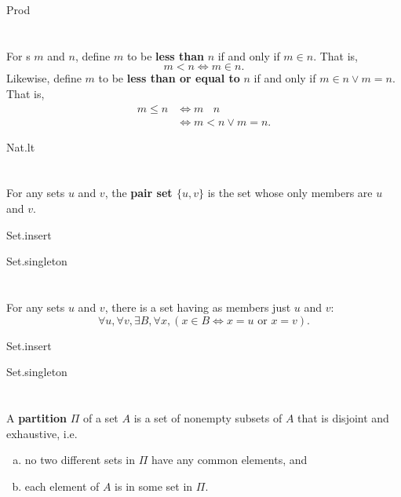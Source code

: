 \documentclass{report}
\newcommand{\ineq}{\,\mathop{\underline{\in}}\,}
\begin{document}
    {Prod}

\section{}%

  For s $m$ and $n$, define $m$ to be
    \textbf{less than} $n$ if and only if $m \in n$.
  That is, $$m < n \iff m \in n.$$
  Likewise, define $m$ to be \textbf{less than or equal to} $n$ if and only if
    $m \in n \lor m = n$.
  That is,
    \begin{align*}
      m \leq n
        & \iff m \ineq n \\
        & \iff m < n \lor m = n.
    \end{align*}

    {Nat.lt}

\section{}%

  For any sets $u$ and $v$, the \textbf{pair set $\{u, v\}$} is the set whose
    only members are $u$ and $v$.

    {Set.insert}

    {Set.singleton}

\section{}%

  For any sets $u$ and $v$, there is a set having as members just $u$ and $v$:
    $$\forall u, \forall v, \exists B, \forall x,
        (x \in B \iff x = u \text{ or } x = v).$$

    {Set.insert}

    {Set.singleton}

\section{}%

  A \textbf{partition} $\Pi$ of a set $A$ is a set of nonempty subsets of $A$
    that is disjoint and exhaustive, i.e.
    \begin{enumerate}[(a)]
      \item no two different sets in $\Pi$ have any common elements, and
      \item each element of $A$ is in some set in $\Pi$.
    \end{enumerate}
\end{document}
